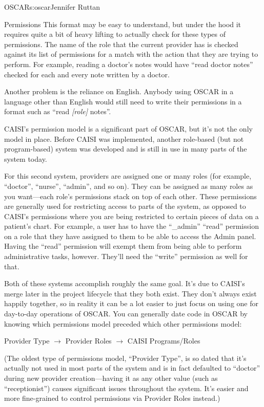 \begin{aosachapter}{OSCAR}{s:oscar}{Jennifer Ruttan}
\begin{aosasect1}{Permissions}
This format may be easy to understand, but under the hood it requires
quite a bit of heavy lifting to actually check for these types of
permissions. The name of the role that the current provider has is
checked against its list of permissions for a match with the action
that they are trying to perform. For example, reading a doctor's notes
would have ``read doctor notes'' checked for each and every note
written by a doctor.

Another problem is the reliance on English. Anybody using OSCAR in a
language other than English would still need to write their
permissions in a format such as ``read \emph{[role]} notes''.

CAISI's permission model is a significant part of OSCAR, but it's not
the only model in place. Before CAISI was implemented, another
role-based (but not program-based) system was developed and is still
in use in many parts of the system today.

For this second system, providers are assigned one or many roles (for
example, ``doctor'', ``nurse'', ``admin'', and so on). They can be
assigned as many roles as you want---each role's permissions stack on
top of each other. These permissions are generally used for
restricting access to parts of the system, as opposed to CAISI's
permissions where you are being restricted to certain pieces of data
on a patient's chart. For example, a user has to have the ``\_admin''
``read'' permission on a role that they have assigned to them to be
able to access the Admin panel. Having the ``read'' permission will
exempt them from being able to perform administrative tasks,
however. They'll need the ``write'' permission as well for that.

Both of these systems accomplish roughly the same goal. It's due to
CAISI's merge later in the project lifecycle that they both
exist. They don't always exist happily together, so in reality it can
be a lot easier to just focus on using one for day-to-day operations
of OSCAR. You can generally date code in OSCAR by knowing which
permissions model preceded which other permissions model:

Provider Type $\rightarrow$ Provider Roles $\rightarrow$ CAISI Programs/Roles

(The oldest type of permissions model, ``Provider Type'', is so dated
that it's actually not used in most parts of the system and is in fact
defaulted to ``doctor'' during new provider creation---having it as
any other value (such as ``receptionist'') causes significant issues
throughout the system. It's easier and more fine-grained to control
permissions via Provider Roles instead.)


\end{aosasect1}
\end{aosachapter}
